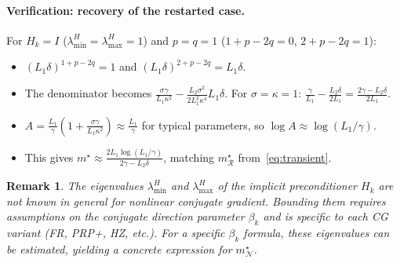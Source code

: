 \documentclass{article}
\newtheorem{remark}{Remark}
\begin{document}
\paragraph{Verification: recovery of the restarted case.} For $H_k = I$ ($\lambda_{\min}^H = \lambda_{\max}^H = 1$) and $p = q = 1$ ($1+p-2q = 0$, $2+p-2q = 1$):
\begin{itemize}
    \item $(L_1\delta)^{1+p-2q} = 1$ and $(L_1\delta)^{2+p-2q} = L_1\delta$.
    \item The denominator becomes $\frac{\sigma\gamma}{L_1\kappa^2} - \frac{L_2\sigma^2}{2L_1^2\kappa^4}L_1\delta$. For $\sigma = \kappa = 1$: $\frac{\gamma}{L_1} - \frac{L_2\delta}{2L_1} = \frac{2\gamma - L_2\delta}{2L_1}$.
    \item $A = \frac{L_1}{\gamma}(1 + \frac{\sigma\gamma}{L_1\kappa^2}) \approx \frac{L_1}{\gamma}$ for typical parameters, so $\log A \approx \log(L_1/\gamma)$.
    \item This gives $m^\star \approx \frac{2L_1\log(L_1/\gamma)}{2\gamma - L_2\delta}$, matching $m^\star_{\mathcal{R}}$ from~\eqref{eq:transient}.
\end{itemize}

\begin{remark}
The eigenvalues $\lambda_{\min}^H$ and $\lambda_{\max}^H$ of the implicit preconditioner $H_k$ are not known in general for nonlinear conjugate gradient. Bounding them requires assumptions on the conjugate direction parameter $\beta_k$ and is specific to each CG variant (FR, PRP+, HZ, etc.). For a specific $\beta_k$ formula, these eigenvalues can be estimated, yielding a concrete expression for $m^\star_{\mathcal{N}}$.
\end{remark}


 
\end{document}
